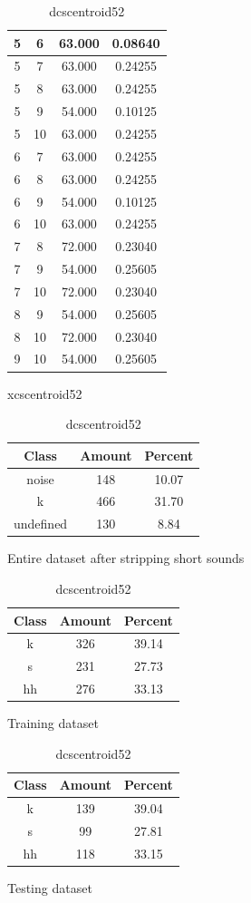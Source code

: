 \begin{table}
\begin{subtable}[h]{0.45\textwidth}
{\begin{tabular}{|c|c|c|c|}
 5 & 6 & 63.000 & 0.08640\\ \hline 
 5 & 7 & 63.000 & 0.24255\\ \hline 
 5 & 8 & 63.000 & 0.24255\\ \hline 
 5 & 9 & 54.000 & 0.10125\\ \hline 
 5 & 10 & 63.000 & 0.24255\\ \hline 
 6 & 7 & 63.000 & 0.24255\\ \hline 
 6 & 8 & 63.000 & 0.24255\\ \hline 
 6 & 9 & 54.000 & 0.10125\\ \hline 
 6 & 10 & 63.000 & 0.24255\\ \hline 
 7 & 8 & 72.000 & 0.23040\\ \hline 
 7 & 9 & 54.000 & 0.25605\\ \hline 
 7 & 10 & 72.000 & 0.23040\\ \hline 
 8 & 9 & 54.000 & 0.25605\\ \hline 
 8 & 10 & 72.000 & 0.23040\\ \hline 
 9 & 10 & 54.000 & 0.25605\\ \hline 

\end{tabular}
}
\caption{xcscentroid52}
\label{xlscentroid52}
\end{subtable}

\begin{subtable}[h]{0.45\textwidth}
\centering
\begin{tabular}{|c|c|c|}
\hline
Class & Amount & Percent\\ \hline
noise & 148 & 10.07\\ \hline
k & 466 & 31.70\\ \hline
undefined & 130 & 8.84\\ \hline
\end{tabular}
\caption{Entire dataset after stripping short sounds}
\end{subtable}
\hfill
\begin{subtable}[h]{0.45\textwidth}
\centering
\begin{tabular}{|c|c|c|}
\hline
Class & Amount & Percent\\ \hline
k & 326 & 39.14\\ \hline
s & 231 & 27.73\\ \hline
hh & 276 & 33.13\\ \hline
\end{tabular}
\caption{Training dataset}
\end{subtable}
\hfill
\begin{subtable}[h]{0.45\textwidth}
\centering
\begin{tabular}{|c|c|c|}
\hline
Class & Amount & Percent\\ \hline
k & 139 & 39.04\\ \hline
s & 99 & 27.81\\ \hline
hh & 118 & 33.15\\ \hline
\end{tabular}
\caption{Testing dataset}
\end{subtable}
\hfill

\caption{dcscentroid52}
\label{dlscentroid52}


\end{table}\clearpage
